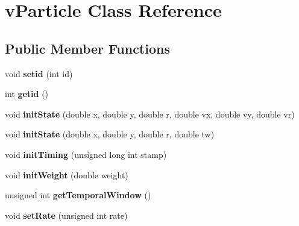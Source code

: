 \hypertarget{classvParticle}{}\section{v\+Particle Class Reference}
\label{classvParticle}
\subsection*{Public Member Functions}
\begin{DoxyCompactItemize}
\item 
void {\bfseries setid} (int id)\hypertarget{classvParticle_a64262c584495ed46940724b4f645db42}{}\label{classvParticle_a64262c584495ed46940724b4f645db42}

\item 
int {\bfseries getid} ()\hypertarget{classvParticle_a121f7c012ccbb6153eda5bee38ba310b}{}\label{classvParticle_a121f7c012ccbb6153eda5bee38ba310b}

\item 
void {\bfseries init\+State} (double x, double y, double r, double vx, double vy, double vr)\hypertarget{classvParticle_a1f1f4121c044427f6a40658305a590c1}{}\label{classvParticle_a1f1f4121c044427f6a40658305a590c1}

\item 
void {\bfseries init\+State} (double x, double y, double r, double tw)\hypertarget{classvParticle_a7a3db503f06737b1752081fbd6fc3a1e}{}\label{classvParticle_a7a3db503f06737b1752081fbd6fc3a1e}

\item 
void {\bfseries init\+Timing} (unsigned long int stamp)\hypertarget{classvParticle_a32a3db438862056c87414bfd7ee61522}{}\label{classvParticle_a32a3db438862056c87414bfd7ee61522}

\item 
void {\bfseries init\+Weight} (double weight)\hypertarget{classvParticle_af4c313f241bb13b00d592f7dae686fd9}{}\label{classvParticle_af4c313f241bb13b00d592f7dae686fd9}

\item 
unsigned int {\bfseries get\+Temporal\+Window} ()\hypertarget{classvParticle_a4bc5705c6b9f4c518318f3d7c4cb7ed6}{}\label{classvParticle_a4bc5705c6b9f4c518318f3d7c4cb7ed6}

\item 
void {\bfseries set\+Rate} (unsigned int rate)\hypertarget{classvParticle_a9d9e636c612d03cd68cd1f1e06179249}{}\label{classvParticle_a9d9e636c612d03cd68cd1f1e06179249}


\end{DoxyCompactItemize}
